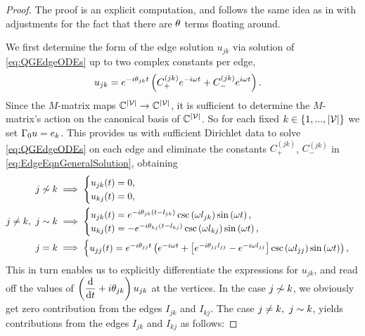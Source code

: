 \begin{proof}
	The proof is an explicit computation, and follows the same idea as in \cite{ershova2014isospectrality} with adjustments for the fact that there are $\theta$ terms floating around. \newline
	
	We first determine the form of the edge solution $u_{jk}$ via solution of \eqref{eq:QGEdgeODEs} up to two complex constants per edge,
	\begin{align} \label{eq:EdgeEqnGeneralSolution}
		u_{jk} &= e^{-i\theta_{jk}t}\left(  C_{+}^{(jk)}e^{-i\omega t} + C_{-}^{(jk)}e^{i\omega t}  \right).
	\end{align}
	Since the $M$-matrix maps $\mathbb{C}^{\left\lvert \mathcal{V} \right\rvert}\rightarrow\mathbb{C}^{\left\lvert \mathcal{V} \right\rvert}$, it is sufficient to determine the $M$-matrix's action on the canonical basis of $\mathbb{C}^{\left\lvert \mathcal{V} \right\rvert}$.
	So for each fixed $k\in\left\{ 1,...,\left\lvert \mathcal{V} \right\rvert \right\}$ we set $\Gamma_0 u = e_k$.
	This provides us with sufficient Dirichlet data to solve \eqref{eq:QGEdgeODEs} on each edge and eliminate the constants $C_{+}^{(jk)}$, $C_{-}^{(jk)}$ in \eqref{eq:EdgeEqnGeneralSolution}, obtaining
	\begin{align*}
		j\not\sim k &\implies
		\begin{cases}
			u_{jk}(t) = 0, \\
			u_{kj}(t) = 0,
		\end{cases} \\
		j\neq k, \ j\sim k &\implies
		\begin{cases}
			u_{jk}(t) = e^{-i\theta_{jk}\left( t-l_{jk} \right)}\csc\left( \omega l_{jk} \right)\sin\left( \omega t \right), \\
			u_{kj}(t) = -e^{-i\theta_{kj}\left( t-l_{kj} \right)}\csc\left( \omega l_{kj} \right)\sin\left( \omega t \right),
		\end{cases} \\
		j = k &\implies 
		\begin{cases}
			u_{jj}(t) = e^{-i\theta_{jj}t} \left(  e^{-i\omega t} + \left[ e^{-i\theta_{jj}l_{jj}}-e^{-i\omega l_{jj}} \right]\csc\left( \omega l_{jj} \right)\sin\left( \omega t \right)   \right),
		\end{cases}
	\end{align*}
	This in turn enables us to explicitly differentiate the expressions for $u_{jk}$, and read off the values of $\left( \dfrac{\mathrm{d}}{\mathrm{d}t}+i\theta_{jk} \right)u_{jk}$ at the vertices.
	In the case $j\not\sim k$, we obviously get zero contribution from the edges $I_{jk}$ and $I_{kj}$.
	The case $j\neq k, \ j\sim k$, yields contributions from the edges $I_{jk}$ and $I_{kj}$ as follows:

\end{proof}
